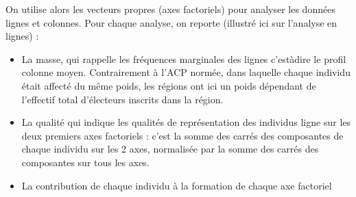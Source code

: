 \documentclass[letterpaper,10pt,english]{jupyterBook}
\begin{document}
\sphinxAtStartPar
{} 

\sphinxAtStartPar
On utilise alors les vecteurs propres (axes factoriels) pour analyser les données lignes et colonnes. Pour chaque analyse, on reporte (illustré ici sur l’analyse en lignes) :
\begin{itemize}
\item {} 
\sphinxAtStartPar
La masse, qui rappelle les fréquences marginales des lignes c’est\sphinxhyphen{}à\sphinxhyphen{}dire le profil colonne moyen. Contrairement à l’ACP normée, dans laquelle chaque individu était affecté du même poids, les régions ont ici un poids dépendant de l’effectif total d’électeurs inscrits dans la région.

\item {} 
\sphinxAtStartPar
La qualité qui indique les qualités de représentation des individus ligne sur les deux premiers axes factoriels : c’est la somme des carrés des composantes de chaque individu sur les 2 axes, normalisée par la somme des carrés des composantes sur tous les axes.

\item {} 
\sphinxAtStartPar
La contribution de chaque individu à la formation de chaque axe factoriel

\end{itemize}
\end{document}
